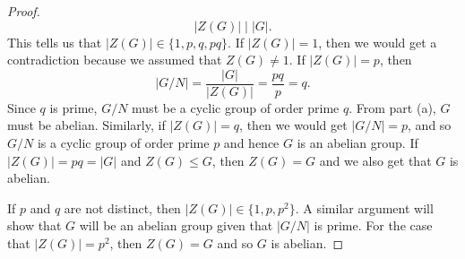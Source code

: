 \documentclass{article}
\begin{document}
\begin{problem}
\begin{enumerate}
\begin{proof}
            \[  | Z(G) | \mid | G |. \]
            This tells us that \( | Z(G) | \in \{ 1, p, q , pq  \}   \). If \( | Z(G)  |  = 1  \), then we would get a contradiction because we assumed that \( Z(G) \neq 1  \). If \( | Z(G) | = p  \), then 
            \[  | G / N  |  = \frac{ | G |  }{ | Z(G) |  }  = \frac{ pq  }{ p  } = q. \]
            Since \( q  \) is prime, \( G / N \) must be a cyclic group of order prime \( q  \). From part (a), \( G  \) must be abelian. Similarly, if \( | Z(G) |  = q  \), then we would get \( | G / N  |  = p   \), and so \( G / N  \) is a cyclic group of order prime \(  p \) and hence \( G  \) is an abelian group. If \( | Z(G) |  = pq = | G |   \) and \( Z(G) \leq G  \), then \( Z(G) = G   \) and we also get that \( G  \) is abelian.

            If \( p  \) and \( q  \) are not distinct, then \( | Z(G) | \in \{ 1, p, p^{2} \}  \). A similar argument will show that \( G  \) will be an abelian group given that \( | G / N |  \) is prime. For the case that \( | Z(G) | = p^{2}  \), then \( Z(G) = G  \) and so \( G  \) is abelian. 
            \end{proof}
    \end{enumerate}
\end{problem}
\end{document}
